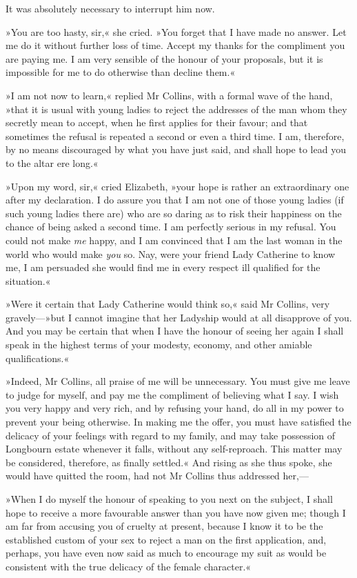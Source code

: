It was absolutely necessary to interrupt him now.

»You are too hasty, sir,« she cried. »You forget that I have made no answer. Let me do it without further loss of time. Accept my thanks for the compliment you are paying me. I am very sensible of the honour of your proposals, but it is impossible for me to do otherwise than decline them.«

»I am not now to learn,« replied Mr Collins, with a formal wave of the hand, »that it is usual with young ladies to reject the addresses of the man whom they secretly mean to accept, when he first applies for their favour; and that sometimes the refusal is repeated a second or even a third time. I am, therefore, by no means discouraged by what you have just said, and shall hope to lead you to the altar ere long.«

»Upon my word, sir,« cried Elizabeth, »your hope is rather an extraordinary one after my declaration. I do assure you that I am not one of those young ladies (if such young ladies there are) who are so daring as to risk their happiness on the chance of being asked a second time. I am perfectly serious in my refusal. You could not make \textit{me} happy, and I am convinced that I am the last woman in the world who would make \textit{you} so. Nay, were your friend Lady Catherine to know me, I am persuaded she would find me in every respect ill qualified for the situation.«

»Were it certain that Lady Catherine would think so,« said Mr Collins, very gravely—»but I cannot imagine that her Ladyship would at all disapprove of you. And you may be certain that when I have the honour of seeing her again I shall speak in the highest terms of your modesty, economy, and other amiable qualifications.«

»Indeed, Mr Collins, all praise of me will be unnecessary. You must give me leave to judge for myself, and pay me the compliment of believing what I say. I wish you very happy and very rich, and by refusing your hand, do all in my power to prevent your being otherwise. In making me the offer, you must have satisfied the delicacy of your feelings with regard to my family, and may take possession of Longbourn estate whenever it falls, without any self-reproach. This matter may be considered, therefore, as finally settled.« And rising as she thus spoke, she would have quitted the room, had not Mr Collins thus addressed her,—

»When I do myself the honour of speaking to you next on the subject, I shall hope to receive a more favourable answer than you have now given me; though I am far from accusing you of cruelty at present, because I know it to be the established custom of your sex to reject a man on the first application, and, perhaps, you have even now said as much to encourage my suit as would be consistent with the true delicacy of the female character.«

